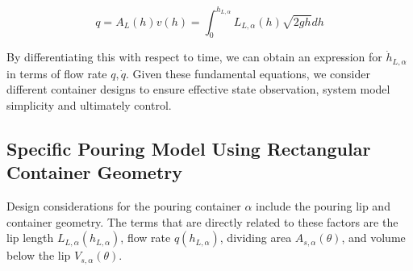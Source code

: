 \begin{equation}
q = A_{L}(h) v(h) = \int_0^{h_{L,\alpha}} L_{L,\alpha}(h) \sqrt{2g h} dh
\label{eqn:flowrate_bernoulli_general}
\end{equation}

By differentiating this with respect to time, we can obtain an expression for $\dot{h}_{L,\alpha}$ in terms of flow rate $q, \dot{q}$. Given these fundamental equations, we consider different container designs to ensure effective state observation, system model simplicity and ultimately control.


\subsection{Specific Pouring Model Using Rectangular Container Geometry}\label{sec:Specific_Pour_Mod}
\begin{comment}
a) Present specific model (rectangular pouring container, in figure), challenges with specific model (present equations basic geometries): 
  1. Lip equation for a) rectangular lip* b) v shape lip c) circular lip
  2. Flowrate for square* vs circular lip
  3. Area of ellipse vs square* container
  4. Volume below the surface for rectangular* container

b) present thrm and proof that this model provides desired simplification:
	Thm1: Rectangular container \alpha parameterized by (H_\alpha, L_{L,\alpha},W,l,\theta) allows for the representation of the entire system state solely in the measured height and of the fluid in the poured to flask h, its derivative \dot{h}, angle of the poured container and wrist $\theta$ with input being angular velocity of the wrist $\omega$.
Proof: substitution of analytical model to represent dynamics in only these terms

c) Present thrm and proof that this model stays within the controllable region with our hybrid control structure given it starts in the required domain.
	Thm2: The proposed analytical model and resultant feedback control is valid in the domain $D_0$ specified by non-zero $x_2 = \dot{h} \neq 0$, and $x_3 = \theta \in (-\frac{\pi}{2}, \frac{\pi}{2})$. And our hybrid control keeps the system in $D_0$, for states starting within D_0 and the point (x_1, x_2=0, x_3=0).
  Proof: represent system states (x1,x2,x3) =(h,dh,th), provide domain for feedback linearization {x2!=0, x2&x3 !=0 simultaneously, x1 in (-pi/2,pi/2)}
\end{comment}

Design considerations for the pouring container $\alpha$ include the pouring lip and container geometry. The terms that are directly related to these factors are the lip length $L_{L,\alpha}(h_{L,\alpha})$, flow rate $q(h_{L,\alpha})$, dividing area $A_{s,\alpha}(\theta)$, and volume below the lip $V_{s,\alpha}(\theta)$.

